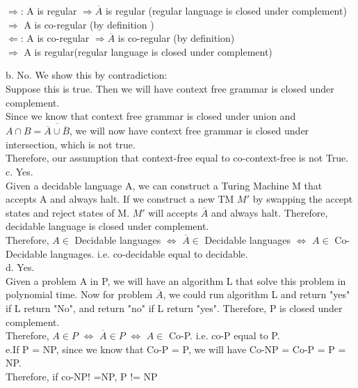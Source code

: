 \documentclass[12pt]{article}
\begin{document}
$\Rightarrow$: A is regular $\Rightarrow \overline{A}$ is regular (regular language is closed under complement) \\
\phantom{A is regular: as} $\Rightarrow$  A is co-regular (by definition )\\
$\Leftarrow$: A is co-regular $\Rightarrow \overline{A}$ is co-regular (by definition) \\
\phantom{A is regular: as} $\Rightarrow$  A is regular(regular language is closed under complement)


b. No. We show this by contradiction:\\
Suppose this is true. Then we will have context free grammar is closed under complement.\\
Since we know that context free grammar is closed under union and $A \cap B = \overline{\overline{A} \cup \overline{B}}$, we will now have 
context free grammar is closed under intersection, which is not true.\\ 
Therefore, our assumption that context-free equal to co-context-free is not True.\\


c. Yes.\\
Given a decidable language A, we can construct a Turing Machine M that accepts A and always halt. If we construct a new TM $M'$ by swapping the accept states and reject states of M.  $M'$ will accepts  $\overline{A}$ and always halt. Therefore, decidable language is closed under complement. \\
Therefore, $A \in $ Decidable languages $\Leftrightarrow$ $\overline{A} \in $ Decidable languages  $\Leftrightarrow$  $A \in $ Co-Decidable languages. i.e. co-decidable equal to decidable.\\


d. Yes.\\
Given a problem A in P, we will have an algorithm L that solve this problem in polynomial time. Now for problem $\overline{A}$, we could run algorithm L and return "yes" if L return "No", and return "no" if L return "yes". Therefore, P is closed under complement.\\
Therefore, $A \in P$  $\Leftrightarrow$ $\overline{A} \in P$   $\Leftrightarrow$  $A \in $ Co-P. i.e. co-P equal to P.\\

e.If P = NP, since we know that Co-P = P, we will have Co-NP = Co-P = P = NP.\\
Therefore, if co-NP! =NP, P != NP
\end{document}
